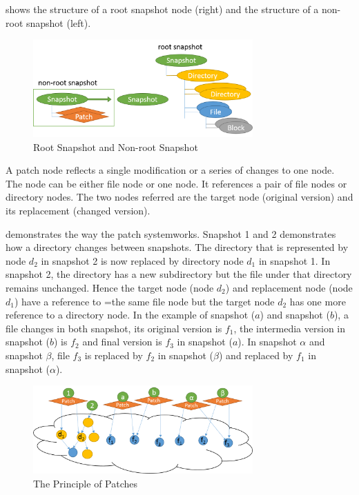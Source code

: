      shows the structure of a root snapshot node (right) and the structure of a non-root snapshot (left).
    
\begin{figure}[hbtp]
\centering
\includegraphics[width=0.75\textwidth]{Chapter-4/figs/fig12.png}
\caption{Root Snapshot and Non-root Snapshot}
\label{fig:root_and_nonroot}
\end{figure}

    A patch node reflects a single modification or a series of changes to one node. The node can be either file node or one node. It references a pair of file nodes or directory nodes. The two nodes referred are the target node (original version) and its replacement (changed version).

     demonstrates the way the patch systemworks. Snapshot 1 and 2 demonstrates how a directory changes between snapshots. The directory that is represented by node $d_2$ in snapshot 2 is now replaced by directory node $d_1$ in snapshot 1. In snapshot 2, the directory has a new subdirectory but the file under that directory remains unchanged. Hence the target node (node $d_2$) and replacement node (node $d_1$) have a reference to =the same file node but the target node $d_2$ has one more reference to a directory node. In the example of snapshot ($a$) and snapshot ($b$), a file changes in both snapshot, its original version is $f_1$, the intermedia version in snapshot ($b$) is $f_2$ and final version is $f_3$ in snapshot ($a$). In snapshot $\alpha$ and snapshot $\beta$, file $f_3$ is replaced by $f_2$ in snapshot ($\beta$) and replaced by $f_1$ in snapshot ($\alpha$).  

\begin{figure}[hbtp]
\centering
\includegraphics[width=0.75\textwidth]{Chapter-4/figs/fig14.png}
\caption{The Principle of Patches}
\label{fig:patches}
\end{figure}

